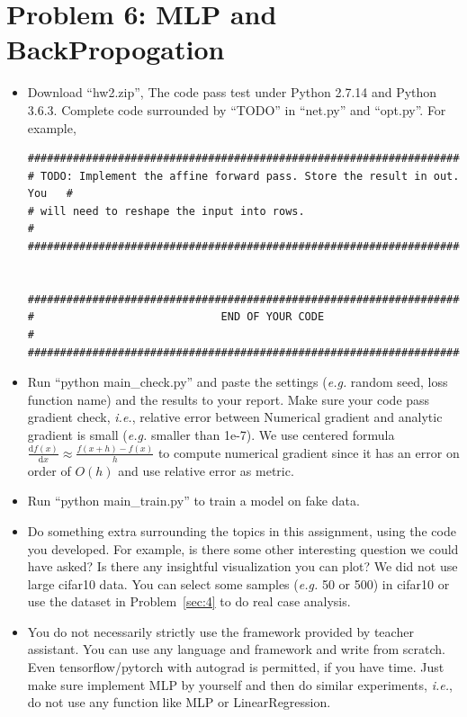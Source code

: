 \documentclass[12pt]{article}
\begin{document}
\section{Problem 6: MLP and BackPropogation} \label{sec:3}

\begin{itemize}
	
	\item Download ``hw2.zip'', The code pass test under Python 2.7.14 and Python 3.6.3. Complete code surrounded by ``TODO'' in ``net.py'' and ``opt.py''. For example,
	      \begin{verbatim}
###########################################################################
# TODO: Implement the affine forward pass. Store the result in out. You   #
# will need to reshape the input into rows.                               #
###########################################################################


###########################################################################
#                             END OF YOUR CODE                            #
###########################################################################
	\end{verbatim}
	\item Run ``python main\_check.py'' and paste the settings (\textit{e.g.} random seed, loss function name) and the results to  your report.  Make sure your code pass gradient check, \textit{i.e.}, relative error between Numerical gradient and analytic gradient is small (\textit{e.g.} smaller than 1e-7). We use centered formula $\displaystyle \frac{\mathrm{d}f(x)}{\mathrm{d}x} \approx \frac{f(x+h)-f(x)}{h}$ to compute numerical gradient since it has an error on order of $O(h)$ and use relative error as metric.
	\item Run ``python main\_train.py'' to train a model on fake data. 
	\item Do something extra surrounding the topics in this assignment,  using the code you developed. For example, is there some other interesting question we could have asked? Is there any insightful visualization you can plot? We did not use large cifar10 data. You can select some samples (\textit{e.g.} 50 or 500) in cifar10 or use the dataset in Problem~\ref{sec:4} to do real case analysis.
	\item You do not necessarily strictly use the framework provided by teacher assistant. You can use any language and framework and write from scratch.
	 Even tensorflow/pytorch with autograd is permitted, if you have time. 
	  Just make sure implement MLP by yourself and then do similar experiments, \textit{i.e.}, do not use any function like MLP or LinearRegression.  
\end{itemize}
\end{document}
